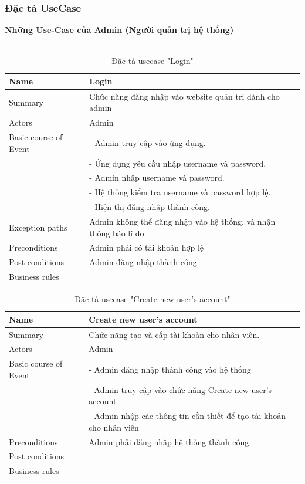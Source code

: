 \documentclass[a4paper]{article}
\begin{document}
\subsubsection{Đặc tả UseCase}
\textbf{Những Use-Case của Admin (Người quản trị hệ thống)}\\
\\
\begin{table}[!h]
    \centering
        \begin{tabular}{|m{3.2cm}|m{10.5cm}|}
        \hline
        Name & Login\\
        \hline
        Summary & Chức năng đăng nhập vào website quản trị dành cho admin\\
        \hline
        Actors & Admin\\
        \hline
        Basic course of Event & -	Admin truy cập vào ứng dụng.\\
                & -	Ứng dụng yêu cầu nhập username và password.\\
                & -	Admin nhập username và password.\\
                & -	Hệ thống kiểm tra username và password hợp lệ.\\
                & -	Hiện thị đăng nhập thành công.
                \\
        \hline
        Exception paths & Admin không thể đăng nhập vào hệ thống, và nhận thông báo lí do\\
        \hline
        Preconditions & Admin phải có tài khoản hợp lệ \\
        \hline
        Post conditions & Admin đăng nhập thành công\\
        \hline
        Business rules & \\
        \hline
        \end{tabular}
        \caption{Đặc tả usecase "Login"}
\end{table}
\clearpage  
\begin{table}[!h]
    \centering
        \begin{tabular}{|m{3.2cm}|m{10.5cm}|}
        \hline
        Name & Create new user’s account\\
        \hline
        Summary & Chức năng tạo và cấp tài khoản cho nhân viên.\\
        \hline
        Actors & Admin\\
        \hline
        Basic course of Event & -	Admin đăng nhập thành công vào hệ thống\\
&-	Admin truy cập vào chức năng Create new user’s account\\
&-	Admin nhập các thông tin cần thiết để tạo tài khoản cho nhân viên\\
        \hline
        Preconditions & Admin phải đăng nhập hệ thống thành công \\
        \hline
        Post conditions &\\
        \hline
        Business rules & \\
        \hline
        \end{tabular}
        \caption{Đặc tả usecase "Create new user’s account"}
\end{table}  
\end{document}

